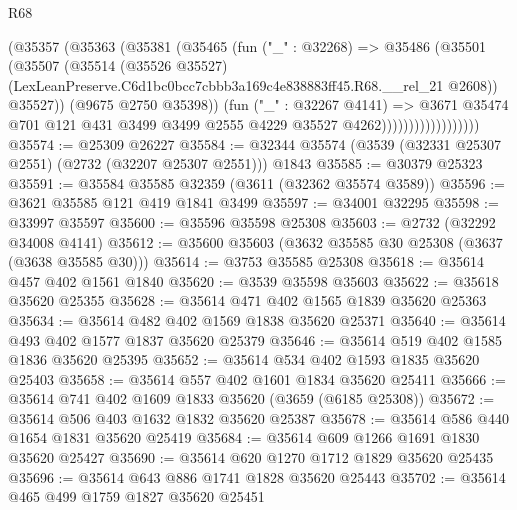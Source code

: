 \begin{lexlean}{R68}
\begin{coremodule}
                              (@35357
                                (@35363
                                  (@35381
                                    (@35465
                                      (fun ("_" : @32268) =>
                                      @35486
                                        (@35501
                                          (@35507
                                            (@35514
                                              (@35526 @35527)
                                              (LexLeanPreserve.C6d1bc0bcc7cbbb3a169c4e838883ff45.R68.__rel_21
                                                @2608))
                                            @35527))
                                        (@9675 @2750 @35398))
                                      (fun ("_" : @32267 @4141) =>
                                      @3671
                                        @35474
                                        @701
                                        @121
                                        @431
                                        @3499
                                        @3499
                                        @2555
                                        @4229
                                        @35527
                                        @4262))))))))))))))))))
@35574 := @25309 @26227
@35584 := @32344 @35574 (@3539 (@32331 @25307 @2551) (@2732 (@32207 @25307 @2551))) @1843
@35585 := @30379 @25323
@35591 := @35584 @35585 @32359 (@3611 (@32362 @35574 @3589))
@35596 := @3621 @35585 @121 @419 @1841 @3499
@35597 := @34001 @32295
@35598 := @33997 @35597
@35600 := @35596 @35598 @25308
@35603 := @2732 (@32292 @34008 @4141)
@35612 := @35600 @35603 (@3632 @35585 @30 @25308 (@3637 (@3638 @35585 @30)))
@35614 := @3753 @35585 @25308
@35618 := @35614 @457 @402 @1561 @1840
@35620 := @3539 @35598 @35603
@35622 := @35618 @35620 @25355
@35628 := @35614 @471 @402 @1565 @1839 @35620 @25363
@35634 := @35614 @482 @402 @1569 @1838 @35620 @25371
@35640 := @35614 @493 @402 @1577 @1837 @35620 @25379
@35646 := @35614 @519 @402 @1585 @1836 @35620 @25395
@35652 := @35614 @534 @402 @1593 @1835 @35620 @25403
@35658 := @35614 @557 @402 @1601 @1834 @35620 @25411
@35666 := @35614 @741 @402 @1609 @1833 @35620 (@3659 (@6185 @25308))
@35672 := @35614 @506 @403 @1632 @1832 @35620 @25387
@35678 := @35614 @586 @440 @1654 @1831 @35620 @25419
@35684 := @35614 @609 @1266 @1691 @1830 @35620 @25427
@35690 := @35614 @620 @1270 @1712 @1829 @35620 @25435
@35696 := @35614 @643 @886 @1741 @1828 @35620 @25443
@35702 := @35614 @465 @499 @1759 @1827 @35620 @25451

\end{coremodule}
\end{lexlean}
